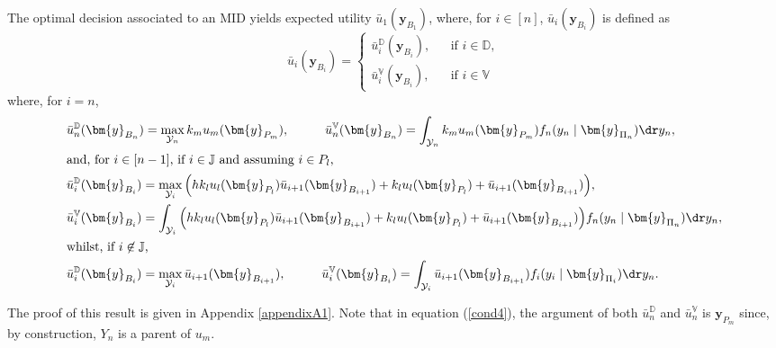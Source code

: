 \begin{proposition}
\label{i-th}
The optimal decision associated to an \gls{MID} yields expected utility $\bar{u}_1(\bm{y}_{B_1})$, where, for $i\in[n]$, $\bar{u}_i(\bm{y}_{B_i})$ is defined as
\begin{equation*}
\label{eq:id1}
\bar{u}_i(\bm{y}_{B_i})=\left\{
\begin{array}{lcl}
\bar{u}_i^{\mathbb{D}}(\bm{y}_{B_i}),&&\mbox{if } i\in\mathbb{D},\\
\bar{u}_i^{\mathbb{V}}(\bm{y}_{B_i}),&&\mbox{if } i\in\mathbb{V}
\end{array}
\right.
\end{equation*}
where, for $i=n$,
\begin{align}
&\bar{u}_n^{\mathbb{D}}(\bm{y}_{B_n})=\max_{\mathcal{Y}_n}k_mu_m(\bm{y}_{P_m}),\hspace{1cm }\bar{u}_n^{\mathbb{V}}(\bm{y}_{B_n})=\int_{\mathcal{Y}_n}k_mu_m(\bm{y}_{P_m})f_n(y_n\;|\;\bm{y}_{\Pi_n})\dr y_n,\label{cond4}\\
\intertext{and, for $i\in[n-1]$, if $i\in \mathbb{J}$ and assuming $i\in P_l$,}
&\bar{u}_i^{\mathbb{D}}(\bm{y}_{B_i})=\max_{\mathcal{Y}_i}\Big(hk_lu_l(\bm{y}_{P_l})\bar{u}_{i+1}(\bm{y}_{B_{i+1}})+k_lu_l(\bm{y}_{P_l})+\bar{u}_{i+1}(\bm{y}_{B_{i+1}})\Big),\label{cond2}\\
&\bar{u}_i^{\mathbb{V}}(\bm{y}_{B_i})=\int_{\mathcal{Y}_i}\Big(hk_lu_l(\bm{y}_{P_l})\bar{u}_{i+1}(\bm{y}_{B_{i+1}})+k_lu_l(\bm{y}_{P_l})+\bar{u}_{i+1}(\bm{y}_{B_{i+1}})\Big)f_n(y_n\;|\;\bm{y}_{\Pi_n})\dr y_n\label{cond3},\\
\intertext{whilst, if $i\not\in\mathbb{J}$,}
&\bar{u}_i^{\mathbb{D}}(\bm{y}_{B_i})=\max_{\mathcal{Y}_i}\bar{u}_{i+1}(\bm{y}_{B_{i+1}}),\hspace{1cm}\bar{u}_i^{\mathbb{V}}(\bm{y}_{B_i})=\int_{\mathcal{Y}_i}\bar{u}_{i+1}(\bm{y}_{B_{i+1}})f_i(y_i\;|\;\bm{y}_{\Pi_i})\dr y_n.\label{cond1}
\end{align}
\end{proposition}
The proof of this result is given in Appendix \ref{appendixA1}.
Note that in equation (\ref{cond4}), the argument of both $\bar{u}_n^{\mathbb{D}}$ and $\bar{u}_n^{\mathbb{V}}$ is $\bm{y}_{P_m}$ since, by construction, $Y_n$ is a parent of $u_m$.

